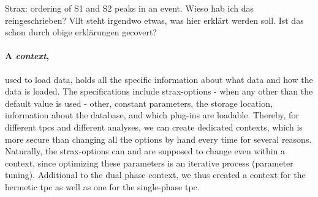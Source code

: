 Strax: ordering of S1 and S2 peaks in an event. Wieso hab ich das reingeschrieben? Vllt steht irgendwo etwas, was hier erklärt werden soll. Ist das schon durch obige erklärungen gecovert?

\paragraph{A \emph{context},} used to load data, holds all the specific information about what data and how the data is loaded.  The specifications include strax-options - when any other than the default value is used - other, constant parameters, the storage location, information about the database, and which plug-ins are loadable.  Thereby, for different \glspl{tpc} and different analyses, we can create dedicated contexts, which is more secure than changing all the options by hand every time for several reasons.  Naturally, the strax-options can and are supposed to change even within a context, since optimizing these parameters is an iterative process (parameter tuning).  Additional to the dual phase context, we thus created a context for the hermetic \gls{tpc} as well as one for the single-phase \gls{tpc}.



